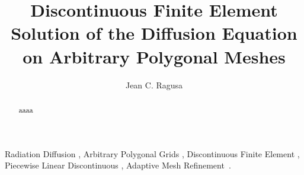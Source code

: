 \documentclass[preprint,10pt]{elsarticle}
\begin{document}
 

\begin{frontmatter}



\title{Discontinuous Finite Element Solution of the Diffusion Equation on Arbitrary Polygonal Meshes}


\author{Jean C. Ragusa}


\begin{abstract}

aaaa

\end{abstract}

\begin{keyword}
  Radiation Diffusion \sep
	Arbitrary Polygonal Grids \sep
  Discontinuous Finite Element \sep
  Piecewise Linear Discontinuous \sep
  Adaptive Mesh Refinement\, .
\end{keyword}

\end{frontmatter}

\end{document}

